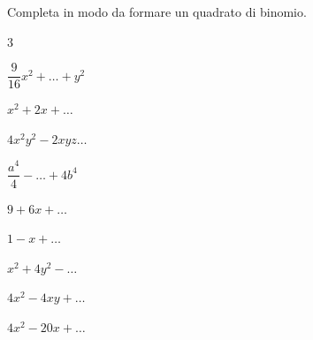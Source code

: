\begin{esercizio}
\label{ese:11.3}
Completa in modo da formare un quadrato di binomio.
\begin{htmulticols}{3}
\begin{enumeratea}
\spazielenx
\item \(\dfrac{9}{16}x^{2}+\ldots +y^{2}\)
\item \(x^{2} + 2x + \ldots \)
\item \(4x^{2}y^{2} - 2xyz \ldots \)
\item \(\dfrac{a^{4}}{4}-\ldots+4b^{4}\)
\item \(9+6x+ \ldots \)
\item \(1-x+ \ldots \)
\item \(x^{2}+4y^{2}-\ldots \)
\item \(4x^{2}-4{xy}+ \ldots \)
\item \(4x^{2}-20x+\ldots \)
\end{enumeratea}
\end{htmulticols}
\end{esercizio}



